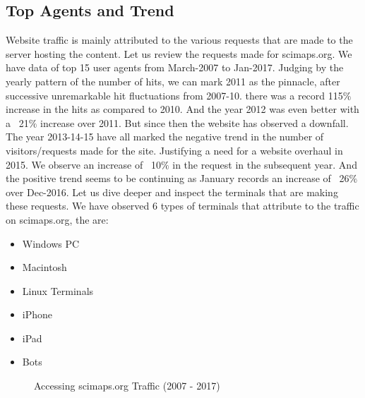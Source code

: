 \subsection{Top Agents and Trend} \label{viztopagents}
Website traffic is mainly attributed to the  various requests that are made to the server hosting the content. Let us review the requests made for scimaps.org. 
We have data of top 15 user agents from March-2007 to Jan-2017.  
Judging by the yearly pattern of the number of hits, we can mark 2011 as the pinnacle, after successive unremarkable hit fluctuations from 2007-10. there was a record 115$\%$ increase in the hits as compared to 2010. And the year 2012 was even better with a ~21$\%$ increase over 2011. But since then the website has observed a downfall. The year 2013-14-15 have all marked the negative trend in the number of visitors/requests made for the site. Justifying a need for a website overhaul in 2015. We observe an increase of ~10$\%$ in the request in the subsequent year. And the positive trend seems to be continuing as January records an increase of ~26$\%$  over Dec-2016.
Let us dive deeper and inspect the terminals that are making these requests. We have observed 6 types of terminals that attribute to the traffic on scimaps.org, the are:
\begin{itemize}
\item Windows PC
\item Macintosh
\item Linux Terminals
\item iPhone
\item iPad
\item Bots
\end{itemize}

\begin{figure}
\centering
{}
\caption{Accessing scimaps.org Traffic (2007 - 2017)}
\label{fig:TopAgents}
\end{figure}

